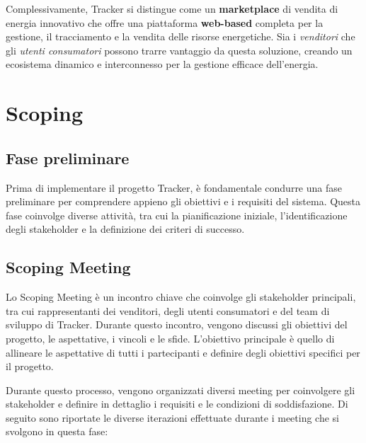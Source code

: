 \documentclass[oneside]{book}
\begin{document}
Complessivamente, Tracker si distingue come un \textbf{marketplace} di vendita di energia innovativo che offre una piattaforma \textbf{web-based} completa per la gestione, il tracciamento e la vendita delle risorse energetiche. Sia i \textit{venditori} che gli \textit{utenti consumatori} possono trarre vantaggio da questa soluzione, creando un ecosistema dinamico e interconnesso per la gestione efficace dell'energia.


\chapter{Scoping}
\section{Fase preliminare}

Prima di implementare il progetto Tracker, è fondamentale condurre una fase preliminare per comprendere appieno gli obiettivi e i requisiti del sistema. Questa fase coinvolge diverse attività, tra cui la pianificazione iniziale, l'identificazione degli stakeholder e la definizione dei criteri di successo.

\section{Scoping Meeting}

Lo Scoping Meeting è un incontro chiave che coinvolge gli stakeholder principali, tra cui rappresentanti dei venditori, degli utenti consumatori e del team di sviluppo di Tracker. Durante questo incontro, vengono discussi gli obiettivi del progetto, le aspettative, i vincoli e le sfide. \newline L'obiettivo principale è quello di allineare le aspettative di tutti i partecipanti e definire degli obiettivi specifici per il progetto.

Durante questo processo, vengono organizzati diversi meeting per coinvolgere gli stakeholder e definire in dettaglio i requisiti e le condizioni di soddisfazione. 
\newline \newline Di seguito sono riportate le diverse iterazioni effettuate durante i meeting che si svolgono in questa fase:
\end{document}
